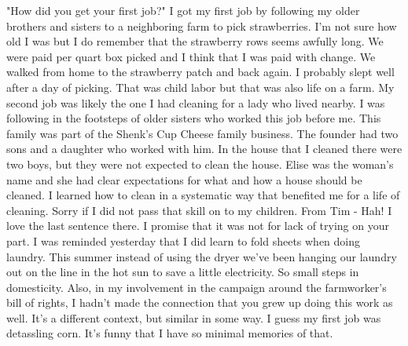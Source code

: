 "How did you get your first job?"
I got my first job by following my older brothers and sisters to a neighboring farm to pick strawberries. I'm not sure how old I was but I do remember that the strawberry rows seems awfully long. We were paid per quart box picked and I think that I was paid with change. We walked from home to the strawberry patch and back again. I probably slept well after a day of picking. That was child labor but that was also life on a farm.
My second job was likely the one I had cleaning for a lady who lived nearby. I was following in the footsteps of older sisters who worked this job before me. This family was part of the Shenk's Cup Cheese family business. The founder had two sons and a daughter who worked with him. In the house that I cleaned there were two boys, but they were not expected to clean the house. Elise was the woman's name and she had clear expectations for what and how a house should be cleaned. I learned how to clean in a systematic way that benefited me for a life of cleaning. Sorry if I did not pass that skill on to my children.
From Tim - Hah! I love the last sentence there. I promise that it was not for lack of trying on your part. I was reminded yesterday that I did learn to fold sheets when doing laundry. This summer instead of using the dryer we've been hanging our laundry out on the line in the hot sun to save a little electricity. So small steps in domesticity.
Also, in my involvement in the campaign around the farmworker's bill of rights, I hadn't made the connection that you grew up doing this work as well. It's a different context, but similar in some way. I guess my first job was detassling corn. It's funny that I have so minimal memories of that.





